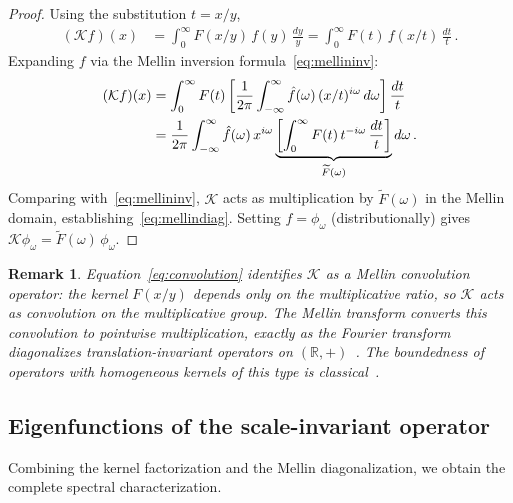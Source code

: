 \documentclass[12pt]{article}
\newtheorem{remark}[theorem]{Remark}
\begin{document}
\begin{proof}
Using the substitution $t = x/y$,
\begin{align}
(\mathcal{K} f)(x) &= \int_0^\infty F(x/y)\, f(y)\, \frac{dy}{y} = \int_0^\infty F(t)\, f(x/t)\, \frac{dt}{t}\,. \label{eq:convolution}
\end{align}
Expanding $f$ via the Mellin inversion formula~\eqref{eq:mellininv}:
\begin{align}
(\mathcal{K} f)(x) &= \int_0^\infty F(t) \left[\frac{1}{2\pi}\int_{-\infty}^\infty \hat{f}(\omega)\,(x/t)^{i\omega}\, d\omega\right] \frac{dt}{t} \notag\\
&= \frac{1}{2\pi}\int_{-\infty}^\infty \hat{f}(\omega)\, x^{i\omega} \underbrace{\left[\int_0^\infty F(t)\, t^{-i\omega}\, \frac{dt}{t}\right]}_{\widetilde{F}(\omega)} d\omega\,. \notag
\end{align}
Comparing with~\eqref{eq:mellininv}, $\mathcal{K}$ acts as multiplication by $\widetilde{F}(\omega)$ in the Mellin domain, establishing~\eqref{eq:mellindiag}. Setting $f = \phi_\omega$ (distributionally) gives $\mathcal{K}\phi_\omega = \widetilde{F}(\omega)\,\phi_\omega$.
\end{proof}

\begin{remark}
Equation~\eqref{eq:convolution} identifies $\mathcal{K}$ as a \emph{Mellin convolution operator}: the kernel $F(x/y)$ depends only on the multiplicative ratio, so $\mathcal{K}$ acts as convolution on the multiplicative group. The Mellin transform converts this convolution to pointwise multiplication, exactly as the Fourier transform diagonalizes translation-invariant operators on $(\mathbb{R}, +)$~\cite{ReedSimon1978,Folland1995}. The boundedness of operators with homogeneous kernels of this type is classical~\cite{HardyLittlewoodPolya1952}.
\end{remark}


\subsection{Eigenfunctions of the scale-invariant operator}

Combining the kernel factorization and the Mellin diagonalization, we obtain the complete spectral characterization.
\end{document}
